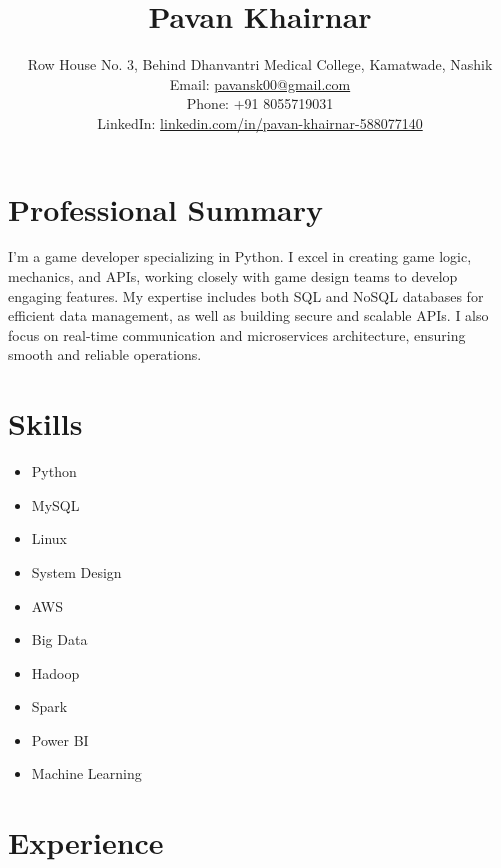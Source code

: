 \documentclass{article}%
\title{Pavan Khairnar}%
\author{
        Row House No. 3, Behind Dhanvantri Medical College, Kamatwade, Nashik \\
        Email: \href{mailto:pavansk00@gmail.com}{pavansk00@gmail.com} \\
        Phone: +91 8055719031 \\
        LinkedIn: \href{https://www.linkedin.com/in/pavan-khairnar-588077140/}{linkedin.com/in/pavan-khairnar-588077140}
    }%
\date{}%
\begin{document}
%
\normalsize%
\maketitle%
\section*{Professional Summary}%
\label{sec:ProfessionalSummary}%
I’m a game developer specializing in Python. I excel in creating game logic, mechanics, and APIs, working closely with game design teams to develop engaging features. My expertise includes both SQL and NoSQL databases for efficient data management, as well as building secure and scalable APIs. I also focus on real{-}time communication and microservices architecture, ensuring smooth and reliable operations.

%
\section*{Skills}%
\label{sec:Skills}%
\begin{itemize}%
\item%
Python%
\item%
MySQL%
\item%
Linux%
\item%
System Design%
\item%
AWS%
\item%
Big Data%
\item%
Hadoop%
\item%
Spark%
\item%
Power BI%
\item%
Machine Learning%
\end{itemize}

%
\section*{Experience}%
\label{sec:Experience}%
\end{document}
